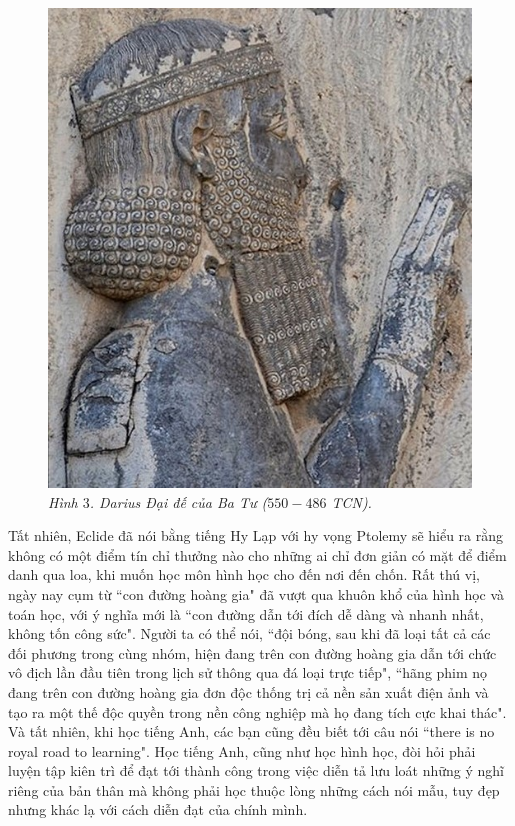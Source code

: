 \begin{multicols}{2}
\begin{figure}[H]
		\captionsetup{labelformat= empty, justification=centering}
		\includegraphics[width= 0.6\linewidth]{2}
		\caption{\small\textit{\color{quantoan}Hình $3$. Darius Đại đế của Ba Tư ($550-486$ TCN).}}
		\vspace*{-10pt}
	\end{figure}
	Tất nhiên, Eclide đã  nói bằng tiếng Hy Lạp với hy vọng Ptolemy sẽ hiểu ra rằng không có một điểm tín chỉ thưởng nào cho những ai chỉ đơn giản có mặt để điểm danh qua loa, khi muốn học môn hình học cho đến nơi đến chốn.
	\vskip 0.1cm
	Rất thú vị, ngày nay cụm từ ``con đường hoàng gia" đã vượt qua khuôn khổ của hình học và toán học, với ý nghĩa mới là ``con đường dẫn tới đích dễ dàng và nhanh nhất, không tốn công sức". Người ta có thể nói, ``đội bóng, sau khi đã loại tất cả các đối phương trong cùng nhóm, hiện đang trên con đường hoàng gia dẫn tới chức vô địch lần đầu tiên trong lịch sử thông qua đá loại trực tiếp", ``hãng phim nọ đang trên con đường hoàng gia đơn độc thống trị cả nền sản xuất điện ảnh và  tạo ra một thế độc quyền trong nền công nghiệp mà họ đang tích cực khai thác". Và tất nhiên, khi học tiếng Anh, các bạn cũng đều biết tới câu nói ``there is no royal road to learning". Học tiếng Anh, cũng như học hình học, đòi hỏi phải luyện tập kiên trì để đạt tới thành công trong việc diễn tả lưu loát những ý nghĩ riêng của bản thân mà không phải học thuộc lòng những cách nói mẫu, tuy đẹp nhưng khác lạ với cách diễn đạt của chính mình. 
	\begin{figure}[H]
		\vspace*{-5pt}
		\centering
		\captionsetup{labelformat= empty, justification=centering}

\end{figure}
\end{multicols}
